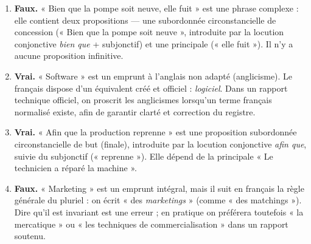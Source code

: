 \documentclass[11pt]{article}
\newcommand{\cle}[1]{{\popxbold\color{popdark}#1}}
\begin{document}
\begin{corrige}
\begin{enumerate}
    \item \textbf{Faux.} « Bien que la pompe soit neuve, elle fuit » est une phrase \cle{complexe} : elle contient deux propositions — une subordonnée circonstancielle de concession (« Bien que la pompe soit neuve », introduite par la locution conjonctive \emph{bien que} + subjonctif) et une principale (« elle fuit »). Il n'y a aucune proposition infinitive.
    \item \textbf{Vrai.} « Software » est un \cle{emprunt} à l'anglais non adapté (anglicisme). Le français dispose d'un équivalent créé et officiel : \emph{logiciel}. Dans un rapport technique officiel, on proscrit les anglicismes lorsqu'un terme français normalisé existe, afin de garantir clarté et correction du registre.
    \item \textbf{Vrai.} « Afin que la production reprenne » est une proposition subordonnée circonstancielle de \cle{but} (finale), introduite par la locution conjonctive \emph{afin que}, suivie du subjonctif (« reprenne »). Elle dépend de la principale « Le technicien a réparé la machine ».
    \item \textbf{Faux.} « Marketing » est un emprunt intégral, mais il suit en français la règle générale du pluriel : on écrit « des \emph{marketings} » (comme « des matchings »). Dire qu'il est invariant est une erreur ; en pratique on préférera toutefois « la mercatique » ou « les techniques de commercialisation » dans un rapport soutenu.
\end{enumerate}
\end{corrige}
\end{document}
